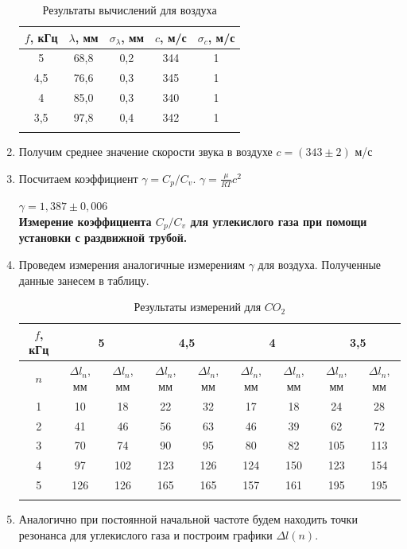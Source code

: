 \documentclass[a4paper, 12pt]{article}%
\begin{document}
\begin{enumerate}
    \begin{longtable}{|c|c|c|c|c|}
    	\hline
    	$ f $, кГц & $ \lambda $, мм & $ \sigma_\lambda $, мм & $ c $, м/с & $ \sigma_c $, м/с \\ \hline
    	5 & 68,8 & 0,2 & 344 & 1 \\ \hline
    	4,5 & 76,6 & 0,3 & 345 & 1 \\ \hline
    	4 & 85,0 & 0,3 & 340 & 1 \\ \hline
    	3,5 & 97,8 & 0,4 & 342 & 1 \\ \hline
    	\caption{Результаты вычислений для воздуха}
    \end{longtable}
    \item Получим среднее значение скорости звука в воздухе $c = (343 \pm 2)$ м/с
    \item Посчитаем коэффициент $\gamma = C_p / C_v $. $\gamma = \frac{\mu}{RT}c^2 $ 
    
    $\gamma = 1,387 \pm 0,006$
    \\

    \textbf{Измерение коэффициента $C_p / C_v $ для углекислого газа при помощи установки с раздвижной трубой.}
    
	\item Проведем измерения аналогичные измерениям $\gamma$ для воздуха. Полученные данные занесем в таблицу.
		\begin{longtable}{|c|c|c|c|c|c|c|c|c|}
		\hline
		$ f $, кГц & \multicolumn{2}{c|}{\textbf{5}} & \multicolumn{2}{c|}{\textbf{4,5}} & \multicolumn{2}{c|}{\textbf{4}} & \multicolumn{2}{c|}{\textbf{3,5}} \\ \hline
		$ n $ & $\Delta l_n $, мм & $ \Delta l_n $, мм & $ \Delta l_n $, мм & $ \Delta l_n $, мм & $ \Delta l_n $, мм & $ \Delta l_n $, мм & $ \Delta l_n $, мм & $ \Delta l_n $, мм  \\ \hline
		1 & 10 & 18 & 22 & 32 & 17 & 18 & 24 & 28  \\ \hline
		2 & 41 & 46 & 56 & 63 & 46 & 39 & 62 & 72 \\ \hline
		3 & 70 & 74 & 90 & 95 & 80 & 82 & 105 & 113  \\ \hline
		4 & 97 & 102 & 123 & 126 & 124 & 150 & 123 & 154 \\ \hline
		5 & 126 & 126 & 165 & 165 & 157 & 161 & 195 & 195  \\ \hline
		\caption{Результаты измерений для $CO_2$}
	\end{longtable}
	\item Аналогично при постоянной начальной частоте будем находить точки резонанса для углекислого газа и построим графики $\Delta l (n)$.
	

\end{enumerate}
\end{document}
